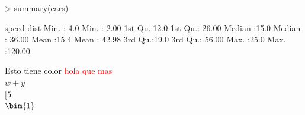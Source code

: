 \documentclass{article}
\newcommand{\uno}[2]{{#1}+{#2}}
\newcommand{\bim}[3][a][b]{{#1}^2+{#2}^2={#3}^2}
\begin{document}
\begin{Schunk}
\begin{Sinput}
> summary(cars)
\end{Sinput}
\begin{Soutput}
     speed           dist       
 Min.   : 4.0   Min.   :  2.00  
 1st Qu.:12.0   1st Qu.: 26.00  
 Median :15.0   Median : 36.00  
 Mean   :15.4   Mean   : 42.98  
 3rd Qu.:19.0   3rd Qu.: 56.00  
 Max.   :25.0   Max.   :120.00  
\end{Soutput}
\end{Schunk}

Esto tiene color \textcolor{red}{hola que mas} \\

$\uno{w}{y}$ \\
$\bim{3}{4}{5}$\\
$\bim{1}$\\
\end{document}
